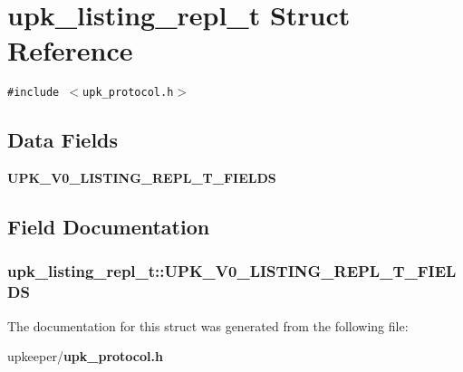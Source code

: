 \section{upk\_\-listing\_\-repl\_\-t Struct Reference}
\label{structupk__listing__repl__t}
{\tt \#include $<$upk\_\-protocol.h$>$}

\subsection*{Data Fields}
\begin{CompactItemize}
\item 
\bf{UPK\_\-V0\_\-LISTING\_\-REPL\_\-T\_\-FIELDS}
\end{CompactItemize}


\subsection{Field Documentation}
\subsubsection{\setlength{\rightskip}{0pt plus 5cm}\bf{upk\_\-listing\_\-repl\_\-t::UPK\_\-V0\_\-LISTING\_\-REPL\_\-T\_\-FIELDS}}\label{structupk__listing__repl__t_48d115f9a0c21752f51c1415bdf70d59}




The documentation for this struct was generated from the following file:\begin{CompactItemize}
\item 
upkeeper/\bf{upk\_\-protocol.h}\end{CompactItemize}

